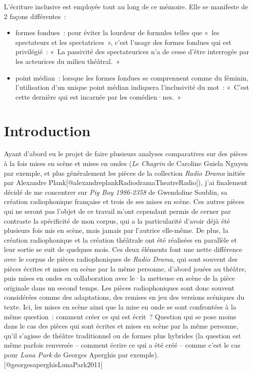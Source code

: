 \documentclass[
]{article}
\providecommand{\tightlist}{%
  \setlength{\itemsep}{0pt}\setlength{\parskip}{0pt}}
\begin{document}
L'écriture inclusive est employée tout au long de ce mémoire. Elle se manifeste de 2 façons différentes~:

\begin{itemize}
\tightlist
\item
  formes fondues~: pour éviter la lourdeur de formules telles que «~les spectateurs et les spectatrices~», c'est l'usage des formes fondues qui est privilégié~: «~La passivité des spectateurices n'a de cesse d'être interrogée par les acteurices du milieu théâtral.~»
\item
  point médian~: lorsque les formes fondues se comprennent comme du féminin, l'utilisation d'un unique point médian indiquera l'inclusivité du mot~: «~C'est cette dernière qui est incarnée par les comédien·nes.~»
\end{itemize}

\section*{Introduction}\label{introduction}

Ayant d'abord eu le projet de faire plusieurs analyses comparatives sur des pièces à la fois mises en scène et mises en ondes (\emph{Le Chagrin} de Caroline Guiela Nguyen par exemple, et plus généralement les pièces de la collection \emph{Radio Drama} initiée par Alexandre Plank{[}@alexandreplankRadiodramaTheatreRadio{]}), j'ai finalement décidé de me concentrer sur \emph{Pig Boy 1986-2358} de Gwendoline Soublin, sa création radiophonique française et trois de ses mises en scène. Ces autres pièces qui ne seront pas l'objet de ce travail m'ont cependant permis de cerner par contraste la spécificité de mon corpus, qui a la particularité d'avoir déjà été plusieurs fois mis en scène, mais jamais par l'autrice elle-même. De plus, la création radiophonique et la création théâtrale ont été réalisées en parallèle et leur sortie se suit de quelques mois. Ces deux éléments font une nette différence avec le corpus de pièces radiophoniques de \emph{Radio Drama}, qui sont souvent des pièces écrites et mises en scène par la même personne, d'abord jouées au théâtre, puis mises en ondes en collaboration avec le·la metteuse en scène de la pièce originale dans un second temps. Les pièces radiophoniques sont donc souvent considérées comme des adaptations, des remises en jeu des versions scéniques du texte. Ici, les mises en scène ainsi que la mise en onde se sont confrontées à la même question~: comment créer ce qui est écrit~? Question qui se pose moins dans le cas des pièces qui sont écrites et mises en scène par la même personne, qu'il s'agisse de théâtre traditionnel ou de formes plus hybrides (la question est même parfois renversée -- comment écrire ce qui a été créé -- comme c'est le cas pour \emph{Luna Park} de Georges Aperghis par exemple).{[}@georgesaperghisLunaPark2011{]}
\end{document}
